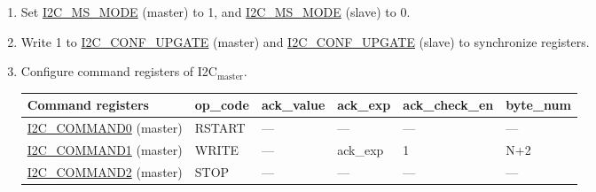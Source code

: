 \documentclass[main\_\_EN.tex]{subfiles}
\begin{document}
\begin{enumerate}
\item Set \hyperref[fielddesc:I2CMSMODE]{I2C\_MS\_MODE} (master) to 1, and \hyperref[fielddesc:I2CMSMODE]{I2C\_MS\_MODE} (slave) to 0.
\item Write 1 to \hyperref[fielddesc:I2CCONFUPGATE]{I2C\_CONF\_UPGATE} (master) and \hyperref[fielddesc:I2CCONFUPGATE]{I2C\_CONF\_UPGATE} (slave) to synchronize registers.
\item Configure command registers of I2C$_\text{master}$.

\begin{longtable}{ | p{5cm} | p{1.5cm} | p{1.5cm} | p{1.5cm} |p{2.5cm} | p{1.5cm} |}
\hline\rowcolor{lightgray}
Command registers& op\_code & ack\_value&ack\_exp&ack\_check\_en&byte\_num  \\ \hline
\hyperref[fielddesc:I2CCOMMAND0]{I2C\_COMMAND0} (master)& RSTART& ---&---&---&---  \\ \hline
\hyperref[fielddesc:I2CCOMMAND1]{I2C\_COMMAND1} (master)& WRITE& ---&ack\_exp&1&N+2  \\ \hline
\hyperref[fielddesc:I2CCOMMAND2]{I2C\_COMMAND2} (master)& STOP& ---&---&---&---  \\ \hline
\end{longtable}


\end{enumerate}
\end{document}
